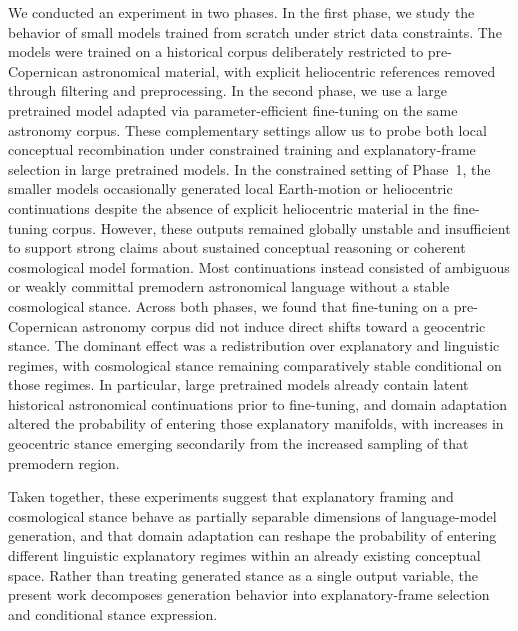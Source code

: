 We conducted an experiment in two phases. In the first phase, we study the behavior of small models trained from scratch under strict data constraints. The models were trained on a historical corpus deliberately restricted to pre-Copernican astronomical material, with explicit heliocentric references removed through filtering and preprocessing. In the second phase, we use a large pretrained model adapted via parameter-efficient fine-tuning on the same astronomy corpus. These complementary settings allow us to probe both local conceptual recombination under constrained training and explanatory-frame selection in large pretrained models.\newline 
In the constrained setting of Phase~1, the smaller models occasionally generated local Earth-motion or heliocentric continuations despite the absence of explicit heliocentric material in the fine-tuning corpus. However, these outputs remained globally unstable and insufficient to support strong claims about sustained conceptual reasoning or coherent cosmological model formation. Most continuations instead consisted of ambiguous or weakly committal premodern astronomical language without a stable cosmological stance.\newline
Across both phases, we found that fine-tuning on a pre-Copernican astronomy corpus did not induce direct shifts toward a geocentric stance. The dominant effect was a redistribution over explanatory and linguistic regimes, with cosmological stance remaining comparatively stable conditional on those regimes. In particular, large pretrained models already contain latent historical astronomical continuations prior to fine-tuning, and domain adaptation altered the probability of entering those explanatory manifolds, with increases in geocentric stance emerging secondarily from the increased sampling of that premodern region.

Taken together, these experiments suggest that explanatory framing and cosmological stance behave as partially separable dimensions of language-model generation, and that domain adaptation can reshape the probability of entering different linguistic explanatory regimes within an already existing conceptual space. Rather than treating generated stance as a single output variable, the present work decomposes generation behavior into explanatory-frame selection and conditional stance expression.


